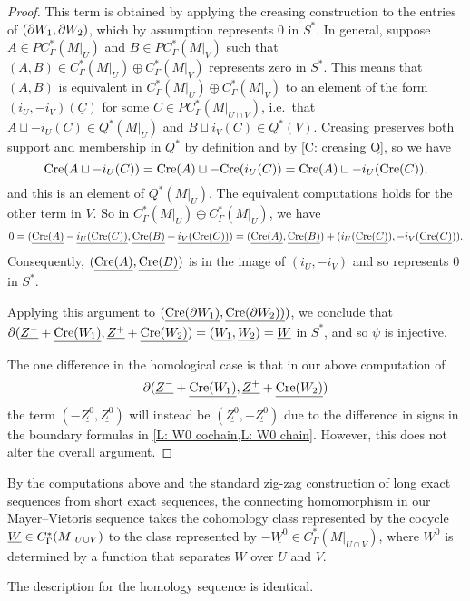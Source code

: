 \begin{proof}
    This term is obtained by applying the creasing construction to the entries of $(\partial W_1,\partial W_2)$, which by assumption represents $0$ in $S^*$.
	In general, suppose $A \in PC^*_{\Gamma}(M|_U)$ and $B \in PC^*_\Gamma(M|_V)$ such that $(\underline{A}, \underline{B}) \in C^*_\Gamma(M|_U) \oplus C^*_\Gamma(M|_V)$ represents zero in $S^*$.
	This means that $(A,B)$ is equivalent in $C^*_\Gamma(M|_U) \oplus C^*_\Gamma(M|_V)$ to an element of the form $(i_U,-i_V)(\underline{C})$ for some $C \in PC^*_{\Gamma}(M|_{U \cap V})$, i.e.\ that $A \sqcup -i_U(C) \in Q^*(M|_U)$ and $B \sqcup i_V(C) \in Q^*(V)$.
	Creasing preserves both support and membership in $Q^*$ by definition and by \cref{C: creasing Q}, so we have
	$$\mathrm{Cre}(A \sqcup -i_U(C)) = \mathrm{Cre}(A) \sqcup -\mathrm{Cre}(i_U(C)) = \mathrm{Cre}(A) \sqcup -i_U(\mathrm{Cre}(C)),$$
	and this is an element of $Q^*(M|_U)$.
	The equivalent computations holds for the other term in $V$.
	So in $C^*_\Gamma(M|_U)\oplus C^*_\Gamma(M|_U)$, we have
    $$0= (\underline{\mathrm{Cre}(A)} -\underline{i_U(\mathrm{Cre}(C))}, \underline{\mathrm{Cre}(B)} + \underline{i_V(\mathrm{Cre}(C))}) = (\underline{\mathrm{Cre}(A)},\underline{\mathrm{Cre}(B)}) +(i_U(\underline{\mathrm{Cre}(C)}), -i_V(\underline{\mathrm{Cre}(C)})).$$
	Consequently, $(\underline{\mathrm{Cre}(A)},\underline{\mathrm{Cre}(B)})$ is in the image of $(i_U, -i_V)$ and so represents $0$ in $S^*$.

	Applying this argument to $(\underline{\mathrm{Cre}(\partial W_1)},\underline{\mathrm{Cre}(\partial W_2))})$, we conclude that
	$\partial (\underline{Z^-} + \underline{\mathrm{Cre}(W_1)},\underline{Z^+} + \underline{\mathrm{Cre}(W_2)}) = (\underline{W_1},\underline{W_2}) = \underline{W}$ in $S^*$, and so $\psi$ is injective.

	The one difference in the homological case is that in our above computation of $$\partial (\underline{Z^-} + \underline{\mathrm{Cre}(W_1)},\underline{Z^+} + \underline{\mathrm{Cre}(W_2)})$$ the term $(-\underline{Z^0},\underline{Z^0})$ will instead be $(\underline{Z^0},-\underline{Z^0})$ due to the difference in signs in the boundary formulas in \cref{L: W0 cochain,L: W0 chain}.
	However, this does not alter the overall argument.
\end{proof}

\begin{remark}\label{R: MV boundary}
	By the computations above and the standard zig-zag construction of long exact sequences from short exact sequences, the connecting homomorphism in our Mayer--Vietoris sequence takes the cohomology class represented by the cocycle $\underline{W} \in C^*_\Gamma(M|_{U \cup V})$ to the class represented by $-\underline{W^0} \in C^*_\Gamma(M|_{U \cap V})$, where $W^0$ is determined by a function that separates $W$ over $U$ and $V$.

	The description for the homology sequence is identical.
\end{remark}

